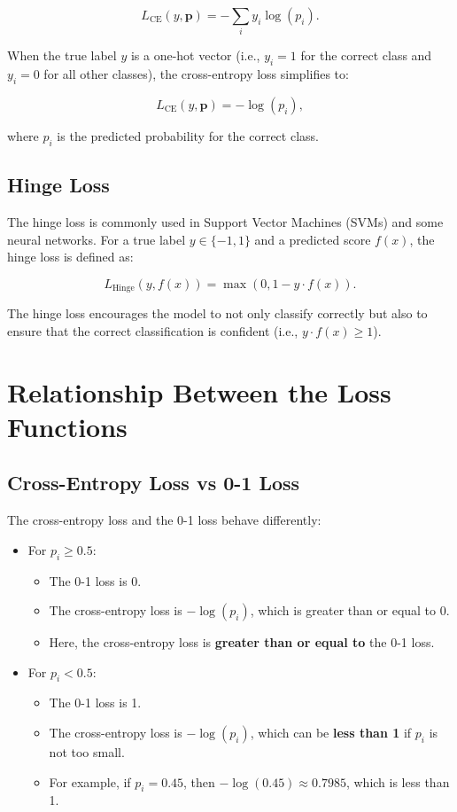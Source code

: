 \begin{notechapter}
\[
L_{\text{CE}}(y, \mathbf{p}) = -\sum_{i} y_i \log(p_i).
\]

When the true label \( y \) is a one-hot vector (i.e., \( y_i = 1 \) 
for the correct class and \( y_i = 0 \) for all other classes), the 
cross-entropy loss simplifies to:

\[
L_{\text{CE}}(y, \mathbf{p}) = -\log(p_i),
\]

where \( p_i \) is the predicted probability for the correct class.

\subsection{Hinge Loss}
The hinge loss is commonly used in Support Vector Machines (SVMs) and 
some neural networks. For a true label \( y \in \{-1, 1\} \) and a 
predicted score \( f(x) \), the hinge loss is defined as:

\[
L_{\text{Hinge}}(y, f(x)) = \max(0, 1 - y \cdot f(x)).
\]

The hinge loss encourages the model to not only classify correctly 
but also to ensure that the correct classification is confident (i.e., 
\( y \cdot f(x) \geq 1 \)).

\section{Relationship Between the Loss Functions}

\subsection{Cross-Entropy Loss vs 0-1 Loss}
The cross-entropy loss and the 0-1 loss behave differently:

\begin{itemize}
    \item For \( p_i \geq 0.5 \):
    \begin{itemize}
        \item The 0-1 loss is 0.
        \item The cross-entropy loss is \( -\log(p_i) \), which is 
              greater than or equal to 0.
        \item Here, the cross-entropy loss is \textbf{greater than or 
              equal to} the 0-1 loss.
    \end{itemize}

    \item For \( p_i < 0.5 \):
    \begin{itemize}
        \item The 0-1 loss is 1.
        \item The cross-entropy loss is \( -\log(p_i) \), which can be 
              \textbf{less than 1} if \( p_i \) is not too small.
        \item For example, if \( p_i = 0.45 \), then \( -\log(0.45) 
              \approx 0.7985 \), which is less than 1.
    \end{itemize}
\end{itemize}


\end{notechapter}
